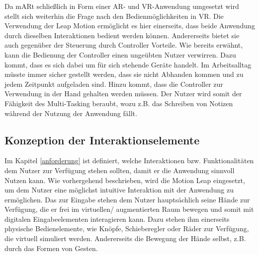 Da mARt schließlich in Form einer AR- und VR-Anwendung umgesetzt wird stellt sich weiterhin die Frage nach den Bedienmöglichkeiten in VR. Die Verwendung der Leap Motion ermöglicht es hier einerseits, dass beide Anwendung durch dieselben Interaktionen bedient werden können. Andererseits bietet sie auch gegenüber der Steuerung durch Controller Vorteile. 
Wie bereits erwähnt, kann die Bedienung der Controller einen ungeübten Nutzer verwirren. Dazu kommt, dass es sich dabei um für sich stehende Geräte handelt. Im Arbeitsalltag müsste immer sicher gestellt werden, dass sie nicht Abhanden kommen und zu jedem Zeitpunkt aufgeladen sind. 
Hinzu kommt, dass die Controller zur Verwendung in der Hand gehalten werden müssen. Der Nutzer wird somit der Fähigkeit des Multi-Tasking beraubt, wozu z.B. das Schreiben von Notizen während der Nutzung der Anwendung fällt. 

\subsection{Konzeption der Interaktionselemente}

Im Kapitel \ref{anforderung} ist definiert, welche Interaktionen bzw. Funktionalitäten dem Nutzer zur Verfügung stehen sollten, damit er die Anwendung sinnvoll Nutzen kann. 
Wie vorhergehend beschrieben, wird die Motion Leap eingesetzt, um dem Nutzer eine möglichst intuitive Interaktion mit der Anwendung zu ermöglichen. Das zur Eingabe stehen dem Nutzer hauptsächlich seine Hände zur Verfügung, die er frei im virtuellen/ augmentierten Raum bewegen und somit mit digitalen Eingabeelementen interagieren kann. 
Dazu stehen ihm einerseits physische Bedienelemente, wie Knöpfe, Schieberegler oder Räder zur Verfügung, die virtuell simuliert werden. Andererseits die Bewegung der Hände selbst, z.B. durch das Formen von Gesten.

